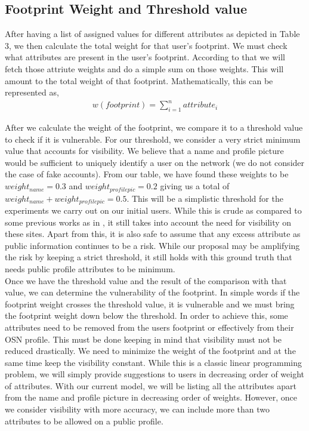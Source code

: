 \documentclass[10pt,conference]{IEEEtran}
\begin{document}
\subsection{Footprint Weight and Threshold value}
After having a list of assigned values for different attributes as depicted in Table 3, we then calculate the total weight for that user's footprint. We must check what attributes are present in the user's footprint. According to that we will fetch those attriute weights and do a simple sum on those weights. This will amount to the total weight of that footprint.
Mathematically, this can be represented as,
\begin{align*}
w(footprint) = \sum_{i=1}^{n}attribute_i
\end{align*}

After we calculate the weight of the footprint, we compare it to a threshold value to check if it is vulnerable. For our threshold, we consider a very strict minimum value that accounts for visibility. We believe that a name and profile picture would be sufficient to uniquely identify a user on the network (we do not consider the case of fake accounts). From our table, we have found these weights to be $ weight_{name} = 0.3 $ and $ weight_{profilepic} = 0.2 $ giving us a total of $ weight_{name} +  weight_{profilepic} = 0.5 $. This will be a simplistic threshold for the experiments we carry out on our initial users. While this is crude as compared to some previous works as in \cite{pidx}, it still takes into account the need for visibility on these sites. Apart from this, it is also safe to assume that any excess attribute as public information continues to be a risk. While our proposal may be amplifying the risk by keeping a strict threshold, it still holds with this ground truth that needs public profile attributes to be minimum. \\

Once we have the threshold value and the result of the comparison with that value, we can determine the vulnerability of the footprint. In simple words if the footprint weight crosses the threshold value, it is vulnerable and we must bring the footprint weight down below the threshold. In order to achieve this, some attributes need to be removed from the users footprint or effectively from their OSN profile. This must be done keeping in mind that visibility must not be reduced drastically. We need to minimize the weight of the footprint and at the same time keep the visibility constant. While this is a classic linear programming problem, we will simply provide suggestions to users in decreasing order of weight of attributes. With our current model, we will be listing all the attributes apart from the name and profile picture in decreasing order of weights. However, once we consider visibility with more accuracy, we can include more than two attributes to be allowed on a public profile. \\
 
\end{document}
